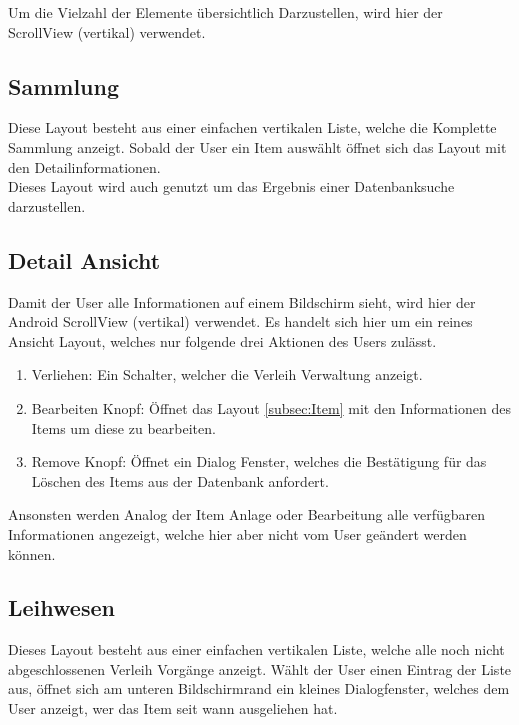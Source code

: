 Um die Vielzahl der Elemente übersichtlich Darzustellen, wird hier der ScrollView (vertikal) verwendet.

\subsection{Sammlung}

Diese Layout besteht aus einer einfachen vertikalen Liste, welche die Komplette Sammlung anzeigt. Sobald der User ein Item auswählt öffnet sich das Layout mit den Detailinformationen.\\

Dieses Layout wird auch genutzt um das Ergebnis einer Datenbanksuche darzustellen.

\subsection{Detail Ansicht}

Damit der User alle Informationen auf einem Bildschirm sieht, wird hier der Android ScrollView (vertikal) verwendet. Es handelt sich hier um ein reines Ansicht Layout, welches nur folgende drei Aktionen des Users zulässt.

\begin{enumerate}
	\item Verliehen: Ein Schalter, welcher die Verleih Verwaltung anzeigt.
	\item Bearbeiten Knopf: Öffnet das Layout \ref{subsec:Item} mit den Informationen des Items um diese zu bearbeiten.
	\item Remove Knopf: Öffnet ein Dialog Fenster, welches die Bestätigung für das Löschen des Items aus der Datenbank anfordert.
\end{enumerate}

Ansonsten werden Analog der Item Anlage oder Bearbeitung alle verfügbaren Informationen angezeigt, welche hier aber nicht vom User geändert werden können.

\subsection{Leihwesen}

Dieses Layout besteht aus einer einfachen vertikalen Liste, welche alle noch nicht abgeschlossenen Verleih Vorgänge anzeigt. Wählt der User einen Eintrag der Liste aus, öffnet sich am unteren Bildschirmrand ein kleines Dialogfenster, welches dem User anzeigt, wer das Item seit wann ausgeliehen hat.

